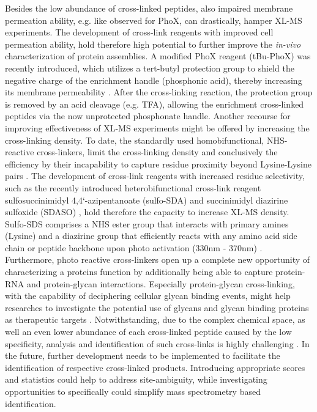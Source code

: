 Besides the low abundance of cross-linked peptides, also impaired membrane permeation ability, e.g. like observed for PhoX, can drastically, hamper XL-MS experiments. The development of cross-link reagents with improved cell permeation ability, hold therefore high potential to further improve the \emph{in-vivo} characterization of protein assemblies. A modified PhoX reagent (tBu-PhoX) \cite{RN16} was recently introduced, which utilizes a tert-butyl protection group to shield the negative charge of the enrichment handle (phosphonic acid), thereby increasing its membrane permeability \cite{RN16}. After the cross-linking reaction, the protection group is removed by an acid cleavage (e.g. TFA), allowing the enrichment cross-linked peptides via the now unprotected phosphonate handle. Another recourse for improving effectiveness of XL-MS experiments might be offered by increasing the cross-linking density. To date, the standardly used homobifunctional, NHS-reactive cross-linkers, limit the cross-linking density and conclusively the efficiency by their incapability to capture residue proximity beyond Lysine-Lysine pairs \cite{RN6}. The development of cross-link reagents with increased residue selectivity, such as the recently introduced heterobifunctional cross-link reagent sulfosuccinimidyl 4,4`-azipentanoate (sulfo-SDA) \cite{RN17} and succinimidyl diazirine sulfoxide (SDASO) \cite{RN18}, hold therefore the capacity to increase XL-MS density. Sulfo-SDS comprises a NHS ester group that interacts with primary amines (Lysine) and a diazirine group that efficiently reacts with any amino acid side chain or peptide backbone upon photo activation (330nm - 370nm) \cite{RN17, RN19, RN20}. Furthermore, photo reactive cross-linkers open up a complete new opportunity of characterizing a proteins function by additionally being able to capture protein-RNA \cite{RN21} and protein-glycan \cite{RN22} interactions. Especially protein-glycan cross-linking, with the capability of deciphering cellular glycan binding events, might help researches to investigate the potential use of glycans and glycan binding proteins as therapeutic targets \cite{RN23}. Notwithstanding, due to the complex chemical space, as well an even lower abundance of each cross-linked peptide caused by the low specificity, analysis and identification of such cross-links is highly challenging \cite{RN24, RN18}. In the future, further development needs to be implemented to facilitate the identification of respective cross-linked products. Introducing appropriate scores and statistics could help to address site-ambiguity, while investigating opportunities to specifically could simplify mass spectrometry based identification.
